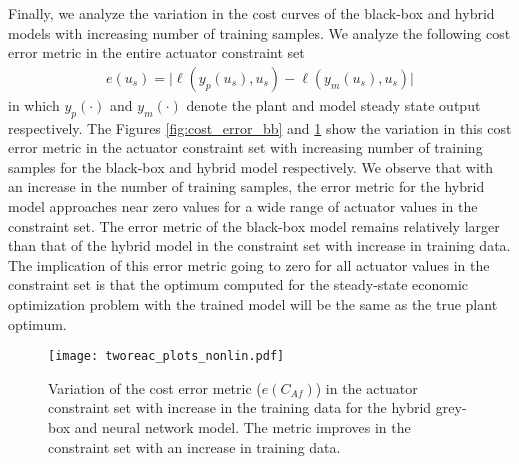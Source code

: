 \documentclass{article}
\begin{document}
Finally, we analyze the variation in the cost curves of the black-box and hybrid
models with increasing number of training samples. We analyze the following cost
error metric in the entire actuator constraint set
\begin{align*}
  e(u_s) = \vert \ell(y_p(u_s), u_s) - \ell(y_m(u_s), u_s) \vert
\end{align*}
in which $y_p(\cdot)$ and $y_m(\cdot)$ denote the plant and model steady state
output respectively. The Figures \ref{fig:cost_error_bb} and
\ref{fig:cost_error_hybrid} show the variation in this cost error metric in the
actuator constraint set with increasing number of training samples for the
black-box and hybrid model respectively. We observe that with an increase in the
number of training samples, the error metric for the hybrid model approaches
near zero values for a wide range of actuator values in the constraint set. The
error metric of the black-box model remains relatively larger than that of the
hybrid model in the constraint set with increase in training data. The
implication of this error metric going to zero for all actuator values in the
constraint set is that the optimum computed for the steady-state economic
optimization problem with the trained model will be the same as the true plant
optimum.

\begin{figure}[!h]
  \centering
  \texttt{[image: tworeac\_plots\_nonlin.pdf]}
  \caption{Variation of the cost error metric ($e(C_{Af})$) in the actuator
  constraint set with increase in the training data for the 
  hybrid grey-box and neural network model. The metric improves in the 
  constraint set with an increase in training data.}
  \label{fig:cost_error_hybrid}
\end{figure}
\end{document}
